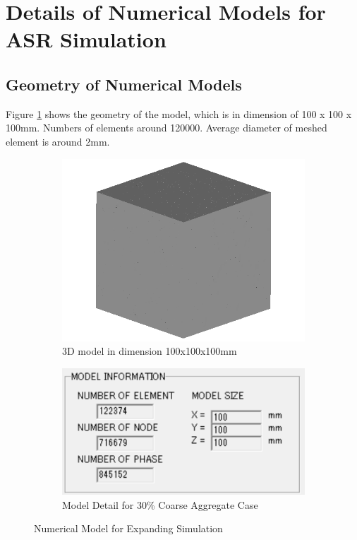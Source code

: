 \section{Details of Numerical Models for ASR Simulation}

\subsection{Geometry of Numerical Models}

Figure \ref{fig:model} shows the geometry of the model, which is in dimension of 100 x 100 x 100mm. Numbers of elements around 120000. Average diameter of meshed element is around 2mm.

\begin{figure}[ht!]
\centering
\begin{subfigure}{.5\textwidth}
  \centering
  \includegraphics[width=.6\linewidth]{Files/exp_3D/Undamaged.png}
  \caption{3D model in dimension 100x100x100mm}
\end{subfigure}%
\begin{subfigure}{.5\textwidth}
  \centering
  \includegraphics[width=.8\linewidth]{Files/Model/A30.png}
  \caption{Model Detail for 30\% Coarse Aggregate Case}
\end{subfigure}
\caption{Numerical Model for Expanding Simulation}
\label{fig:model}
\end{figure}

